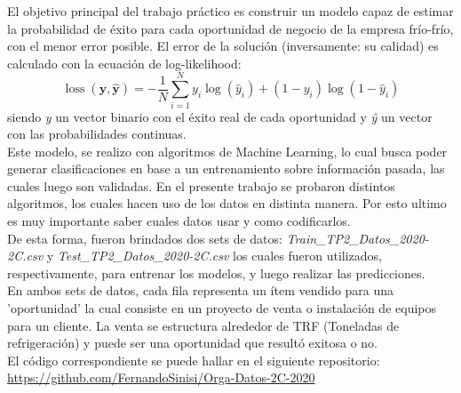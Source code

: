 \documentclass[12pt,a4paper]{article}
\begin{document}
El objetivo principal del trabajo práctico es construir un modelo capaz de estimar la probabilidad de éxito para cada oportunidad de negocio de la empresa frío-frío, con el menor error posible. El error de la solución (inversamente: su calidad) es calculado con la ecuación de log-likelihood:
\begin{equation}
\operatorname{loss}(\mathbf{y}, \hat{\mathbf{y}})=-\frac{1}{N} \sum_{i=1}^{N} y_{i} \log \left(\hat{y}_{i}\right)+\left(1-y_{i}\right) \log \left(1-\hat{y}_{i}\right)
\end{equation}
siendo \textit{y} un vector binario con el éxito real de cada oportunidad y \textit{ŷ} un vector con las probabilidades continuas. \\
Este modelo, se realizo con algoritmos de Machine Learning, lo cual busca poder generar clasificaciones en base a un entrenamiento sobre información pasada, las cuales luego son validadas. En el presente trabajo se probaron distintos algoritmos, los cuales hacen uso de los datos en distinta manera. Por esto ultimo es muy importante saber cuales datos usar y como codificarlos. \\
De esta forma, fueron brindados dos sets de datos: 
\textit{Train\_TP2\_Datos\_2020-2C.csv} y \textit{Test\_TP2\_Datos\_2020-2C.csv} los cuales fueron utilizados, respectivamente, para entrenar los modelos, y luego realizar las predicciones. \\
En ambos sets de datos, cada fila representa un ítem
vendido para una ’oportunidad’ la cual consiste en un proyecto de venta o instalación de equipos para un cliente. La venta se estructura alrededor de TRF (Toneladas de refrigeración) y puede ser una oportunidad que resultó exitosa o no. \\
El código correspondiente se puede hallar en el siguiente repositorio: \url{https://github.com/FernandoSinisi/Orga-Datos-2C-2020}
\newpage
  
\end{document}
